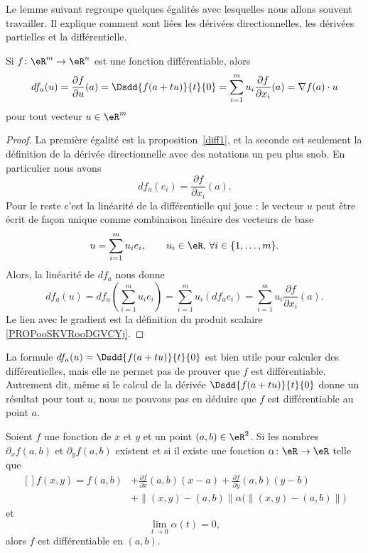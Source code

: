 Le lemme suivant regroupe quelques égalités avec lesquelles nous allons souvent travailler. Il explique comment sont liées les dérivées directionnelles, les dérivées partielles et la différentielle.
\begin{lemma}		\label{LemdfaSurLesPartielles}
	Si \( f\colon \eR^m\to \eR^n\) est une fonction différentiable, alors
	\begin{equation}
		df_a(u)=\frac{ \partial f }{ \partial u }(a)=\Dsdd{ f(a+tu) }{t}{0}=\sum_{i=1}^mu_i\frac{ \partial f }{ \partial x_i }(a)=\nabla f(a)\cdot u
	\end{equation}
	pour tout vecteur \( u\in\eR^m\)
\end{lemma}

\begin{proof}
	La première égalité est la proposition~\ref{diff1}, et la seconde est seulement la définition de la dérivée directionnelle avec des notations un peu plus snob. En particulier nous avons
	\begin{equation}
		df_a(e_i)=\frac{ \partial f }{ \partial x_i }(a).
	\end{equation}
	Pour le reste c'est la linéarité de la différentielle qui joue : le vecteur \( u\) peut être écrit de façon unique comme combinaison linéaire des vecteurs de base
	\[
		u=\sum_{i=1}^{m}u_i e_i, \qquad  u_i\in\eR,\, \forall i\in\{1,\ldots, m\}.
	\]
	Alors, la linéarité de \( df_a\) nous donne
	\begin{equation}
		df_a(u)= df_a\left(\sum_{i=1}^{m}u_i e_i\right)
		=\sum_{i=1}^{m}u_i \left(df_ae_i\right)
		=\sum_{i=1}^{m}u_i \frac{ \partial f }{ \partial x_i }(a).
	\end{equation}
	Le lien avec le gradient est la définition du produit scalaire \eqref{PROPooSKVRooDGVCYj}.
\end{proof}

La formule \( df_a(u)=\Dsdd{ f(a+tu) }{t}{0}\) est bien utile pour calculer des différentielles, mais elle ne permet pas de prouver que \( f\) est différentiable. Autrement dit, même si le calcul de la dérivée \( \Dsdd{ f(a+tu) }{t}{0}\) donne un résultat pour tout \( u\), nous ne pouvons pas en déduire que \( f\) est différentiable au point \( a\).


\begin{proposition} \label{PropExistDiffUn}
	Soient \( f\) une fonction de \( x\) et \( y\) et un point \( (a,b)\in\eR^2\). Si les nombres \( \partial_xf(a,b)\) et \( \partial_yf(a,b)\) existent et si il existe une fonction \( \alpha\colon \eR\to \eR\) telle que
	\begin{equation}        \label{eqCritDifffabsrt}
		\begin{aligned}[]
			f(x,y)=f(a,b) & +\frac{ \partial f }{ \partial x }(a,b)(x-a)+\frac{ \partial f }{ \partial y }(a,b)(y-b) \\
			              & +\| (x,y)-(a,b) \| \alpha\Big( \| (x,y)-(a,b) \| \Big)
		\end{aligned}
	\end{equation}
	et
	\begin{equation}
		\lim_{t\to 0} \alpha(t)=0,
	\end{equation}
	alors \( f\) est différentiable en \( (a,b)\).
\end{proposition}


